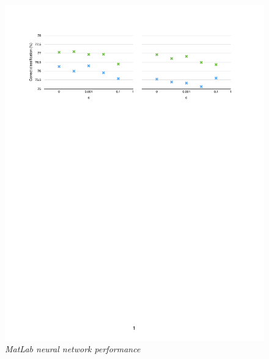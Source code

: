 \documentclass          {article} %
\begin{document}
\begin                  {figure}
\begin                  {center}
\includegraphics        [scale = 0.6]
                        {fig2.pdf}
\caption                {\small\textit{MatLab neural network performance}}%
\label                  {fig:fig2}
\end                    {center}
\end                    {figure}
\end{document}
